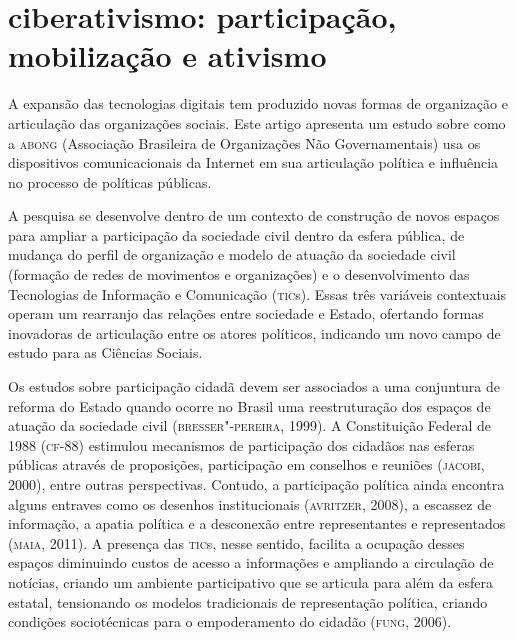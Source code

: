 \part{ciberativismo: participação, mobilização e ativismo} %


\begin{flushright}
\end{flushright}


\noindent{}A expansão das tecnologias digitais tem produzido novas formas de
organização e articulação das organizações sociais. Este artigo
apresenta um estudo sobre como a \textsc{abong} (Associação Brasileira de
Organizações Não Governamentais) usa os dispositivos comunicacionais da
Internet em sua articulação política e influência no processo de
políticas públicas.

A pesquisa se desenvolve dentro de um contexto de construção de novos
espaços para ampliar a participação da sociedade civil dentro da esfera
pública, de mudança do perfil de organização e modelo de atuação da
sociedade civil (formação de redes de movimentos e organizações) e o
desenvolvimento das Tecnologias de Informação e Comunicação (\textsc{tic}s).
Essas três variáveis contextuais operam um rearranjo das relações entre
sociedade e Estado, ofertando formas inovadoras de articulação entre os
atores políticos, indicando um novo campo de estudo para as Ciências
Sociais.

Os estudos sobre participação cidadã devem ser associados a uma
conjuntura de reforma do Estado quando ocorre no Brasil uma
reestruturação dos espaços de atuação da sociedade civil
(\textsc{bresser"-pereira}, 1999). A Constituição Federal de 1988 (\textsc{cf}-88)
estimulou mecanismos de participação dos cidadãos nas esferas públicas
através de proposições, participação em conselhos e reuniões (\textsc{jacobi},
2000), entre outras perspectivas. Contudo, a participação política ainda
encontra alguns entraves como os desenhos institucionais (\textsc{avritzer},
2008), a escassez de informação, a apatia política e a desconexão entre
representantes e representados (\textsc{maia}, 2011). A presença das \textsc{tic}s, nesse
sentido, facilita a ocupação desses espaços diminuindo custos de acesso
a informações e ampliando a circulação de notícias, criando um ambiente
participativo que se articula para além da esfera estatal, tensionando
os modelos tradicionais de representação política, criando condições
sociotécnicas para o empoderamento do cidadão (\textsc{fung}, 2006).

